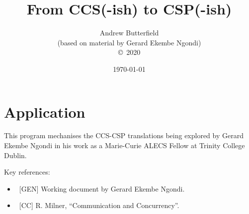 \documentclass[fleqn,10pt]{report}
\author{
Andrew Butterfield
\\(based on material by Gerard Ekembe Ngondi)
\\
{\small \copyright\ 2020}
}
\title{
  From CCS(-ish) to CSP(-ish)
}
\date{
\today
}
\begin{document}
\maketitle
\tableofcontents


\chapter{Application}

This program mechanises the CCS-CSP translations
being explored by Gerard Ekembe Ngondi
in his work as a Marie-Curie ALECS Fellow at Trinity College Dublin.

Key references:
\begin{itemize}
  \item ~[GEN] Working document by Gerard Ekembe Ngondi.
  \item ~[CC] R. Milner, ``Communication and Concurrency''.
\end{itemize}

% 
%
%
\newpage

\newpage

% 
%
%
%
%
% 

% 



\end{document}

